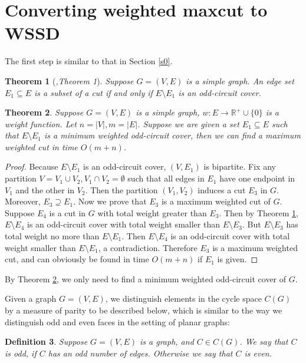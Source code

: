 \documentclass[10pt,fleqn]{article}
\newtheorem{theorem}{Theorem}[section]
\newtheorem{definition}[theorem]{Definition}
\newcommand{\R}{\mathbb{R}}
\newcommand{\rs}{\setminus}
\begin{document}
	\section{Converting weighted maxcut to WSSD}\label{s3}
	The first step is similar to that in Section \ref{s0}.
	\begin{theorem}[\it{\cite{79},Theorem 1}]\label{thm30}
		Suppose $G=(V,E)$ is a simple graph. An edge set $E_1\subseteq E$ is a subset of a cut if and only if $E\rs E_1$ is an odd-circuit cover.
	\end{theorem} \par
	\begin{theorem}\label{thm31}
		Suppose $G=(V,E)$ is a simple graph, $w:E\to \R^+\cup\{0\}$ is a weight function. Let $n=|V|,m=|E|$. Suppose we are given a set $E_1\subseteq E$ such that $E\rs E_1$ is a minimum weighted odd-circuit cover, then we can find a maximum weighted cut in time $O(m+n)$.
	\end{theorem} \par
	\begin{proof}
		Because $E\rs E_1$ is an odd-circuit cover, $(V,E_1)$ is bipartite. Fix any partition $V=V_1\cup V_2,V_1\cap V_2=\emptyset$ such that all edges in $E_1$ have one endpoint in $V_1$ and the other in $V_2$. Then the partition $(V_1,V_2)$ induces a cut $E_3$ in $G$. Moreover, $E_3\supseteq E_1$. Now we prove that $E_3$ is a maximum weighted cut of $G$. Suppose $E_4$ is a cut in $G$ with total weight greater than $E_3$. Then by Theorem \ref{thm30}, $E\rs E_4$ is an odd-circuit cover with total weight smaller than $E\rs E_3$. But $E\rs E_3$ has total weight no more than $E\rs E_1$. Then $E\rs E_4$ is an odd-circuit cover with total weight smaller than $E\rs E_1$, a contradiction. Therefore $E_3$ is a maximum weighted cut, and can obviously be found in time $O(m+n)$ if $E_1$ is given.
	\end{proof} \par
	By Theorem \ref{thm31}, we only need to find a minimum weighted odd-circuit cover of $G$. \par
	Given a graph $G=(V,E)$, we distinguish elements in the cycle space $C(G)$ by a measure of parity to be described below, which is similar to the way we distinguish odd and even faces in the setting of planar graphs:
	\begin{definition}
		Suppose $G=(V,E)$ is a graph, and $C\in C(G)$. We say that $C$ is odd, if $C$ has an odd number of edges. Otherwise we say that $C$ is even.
	\end{definition} \par
\end{document}

